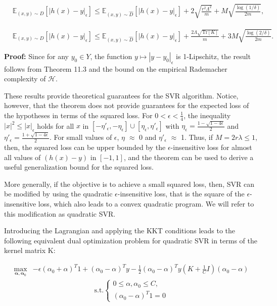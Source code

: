 \documentclass[fleqn,10pt]{olplainarticle}
\begin{document}
\[
\begin{aligned}
    &\mathbb{E}_{(x,y) \sim D} \left[ |h(x) - y|_\epsilon \right] \leq \mathbb{E}_{(x,y) \sim \hat{D}} \left[ |h(x) - y|_\epsilon \right] + 2 \sqrt{\frac{r^2 \Lambda^2}{m}} + M\sqrt{\frac{\log(1/\delta)}{2m}} ,
\end{aligned}
\]

\[
\begin{aligned}
    &\mathbb{E}_{(x,y) \sim D} \left[ |h(x) - y|_\epsilon \right] \leq \mathbb{E}_{(x,y) \sim \hat{D}} \left[ |h(x) - y|_\epsilon \right] + \frac{2\Lambda \sqrt{\text{Tr}[K]}}{m} + 3M \sqrt{\frac{\log(2/\delta)}{2m}}.
\end{aligned}
\]

\textbf{Proof:} Since for any $y_0 \in Y$, the function $y \mapsto |y - y_0|_\epsilon$ is 1-Lipschitz, the result follows from Theorem 11.3 and the bound on the empirical Rademacher complexity of $\mathcal{H}$.

These results provide theoretical guarantees for the SVR algorithm. Notice, however, that the theorem does not provide guarantees for the expected loss of the hypotheses in terms of the squared loss. For \(0 < \epsilon < \frac{1}{4}\), the inequality \(|x|^2 \leq |x|_\epsilon\) holds for all \(x\) in \([- \eta'_\epsilon, - \eta_\epsilon] \cup [\eta_\epsilon, \eta'_\epsilon]\) with \(\eta_\epsilon = \frac{1-\sqrt{1-{4\epsilon}}}{2}\) and \(\eta'_\epsilon = \frac{1+\sqrt{1-{4\epsilon}}}{2}\). For small values of \(\epsilon\), \(\eta\) $\approx$ 0 and \(\eta'_\epsilon\) $\approx$ 1. Thus, if \(M = 2r\lambda \leq 1\), then, the squared loss can be upper bounded by the \(\epsilon\)-insensitive loss for almost all values of \((h(x) - y)\) in \([-1, 1]\), and the theorem can be used to derive a useful generalization bound for the squared loss.

More generally, if the objective is to achieve a small squared loss, then, SVR can be modified by using the quadratic \(\epsilon\)-insensitive loss, that is the square of the \(\epsilon\)-insensitive loss, which also leads to a convex quadratic program. We will refer to this modification as quadratic SVR.

Introducing the Lagrangian and applying the KKT conditions leads to the following equivalent dual optimization problem for quadratic SVR in terms of the kernel matrix K:

\[
\begin{aligned}
    \max_{\boldsymbol{\alpha}, \boldsymbol{\alpha}_0} & -\epsilon(\alpha_0 + \alpha)^T1 + (\alpha_0 - \alpha)^Ty - \frac{1}{2} ({\alpha_0} - {\alpha})^T {y} ({K} + \frac{1}{C} I)(\alpha_0 - \alpha) 
\end{aligned}
\]
\[
\begin{aligned}
    \text{s.t.}\begin{cases}0 \leq {\alpha}, {\alpha}_0 \leq C, \\
    (\alpha_0 - \alpha)^T1 = 0
    \end{cases}
\end{aligned}
\]
\end{document}
